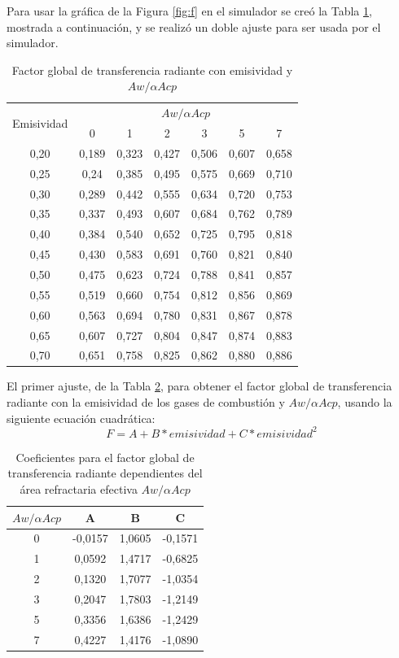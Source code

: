 \par Para usar la gráfica de la Figura \ref{fig:f} en el simulador se creó la Tabla \ref{tbl:f-fac}, mostrada a continuación, y se realizó un doble ajuste para ser usada por el simulador.
\begin{table}[H]
\caption{Factor global de transferencia radiante con emisividad y $Aw/\alpha Acp$}
\label{tbl:f-fac}
\centering
\begin{tabular}{c|c|c|c|c|c|c}
\multirow{2}{5em}{Emisividad}&\multicolumn{6}{c}{$Aw/\alpha Acp$}\\
        & 0	    & 1	    & 2	    & 3 	& 5	    & 7     \\
\hline
0,20    & 0,189	& 0,323	& 0,427	& 0,506	& 0,607	& 0,658 \\
0,25    & 0,24	& 0,385	& 0,495	& 0,575	& 0,669	& 0,710 \\
0,30	& 0,289	& 0,442	& 0,555	& 0,634	& 0,720	& 0,753 \\
0,35	& 0,337	& 0,493	& 0,607	& 0,684	& 0,762	& 0,789 \\
0,40	& 0,384	& 0,540	& 0,652	& 0,725	& 0,795	& 0,818 \\
0,45	& 0,430	& 0,583	& 0,691	& 0,760	& 0,821	& 0,840 \\
0,50	& 0,475	& 0,623	& 0,724	& 0,788	& 0,841	& 0,857 \\
0,55	& 0,519	& 0,660	& 0,754	& 0,812	& 0,856	& 0,869 \\
0,60	& 0,563	& 0,694	& 0,780	& 0,831	& 0,867	& 0,878 \\
0,65	& 0,607	& 0,727	& 0,804	& 0,847	& 0,874	& 0,883 \\
0,70	& 0,651	& 0,758	& 0,825	& 0,862	& 0,880	& 0,886 \\
\end{tabular}
\end{table}

\par El primer ajuste, de la Tabla \ref{tbl:f-coef}, para obtener el factor global de transferencia radiante con la emisividad de los gases de combustión y $Aw/\alpha Acp$, usando la siguiente ecuación cuadrática:
\begin{equation}
\label{eq:f-fac}
F = A + B*emisividad + C*emisividad^2
\end{equation}
\begin{table}[H]
\caption{Coeficientes para el factor global de transferencia radiante dependientes del área refractaria efectiva $Aw/\alpha Acp$}
\label{tbl:f-coef}
\centering
\begin{tabular}{c|c|c|c}
$Aw/\alpha Acp$	&A	        & B	        &C      \\
\hline
0	    &-0,0157	& 1,0605	&-0,1571\\
1	    & 0,0592	& 1,4717	&-0,6825\\
2	    & 0,1320	& 1,7077	&-1,0354\\
3	    & 0,2047	& 1,7803	&-1,2149\\
5	    & 0,3356	& 1,6386	&-1,2429\\
7	    & 0,4227	& 1,4176	&-1,0890\\
\end{tabular}
\end{table}

